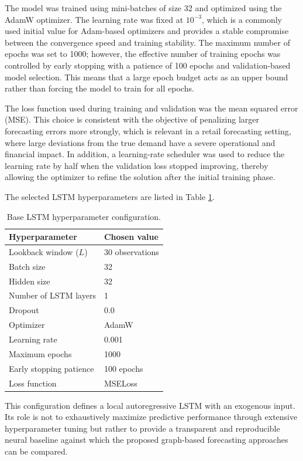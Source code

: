 The model was trained using mini-batches of size 32 and optimized using the AdamW optimizer. The learning rate was fixed at $10^{-3}$, which is a commonly used initial value for Adam-based optimizers and provides a stable compromise between the convergence speed and training stability. The maximum number of epochs was set to 1000; however, the effective number of training epochs was controlled by early stopping with a patience of 100 epochs and validation-based model selection. This means that a large epoch budget acts as an upper bound rather than forcing the model to train for all epochs.

The loss function used during training and validation was the mean squared error (MSE). This choice is consistent with the objective of penalizing larger forecasting errors more strongly, which is relevant in a retail forecasting setting, where large deviations from the true demand have a severe operational and financial impact. In addition, a learning-rate scheduler was used to reduce the learning rate by half when the validation loss stopped improving, thereby allowing the optimizer to refine the solution after the initial training phase.

The selected LSTM hyperparameters are listed in Table \ref{tab:lstm_hyperparameters}.

\begin{table}[H]
\centering
\caption{Base LSTM hyperparameter configuration.}
\label{tab:lstm_hyperparameters}
\begin{tabular}{ll}
\hline
\textbf{Hyperparameter} & \textbf{Chosen value} \\
\hline
Lookback window ($L$) & 30 observations \\
Batch size & 32 \\
Hidden size & 32 \\
Number of LSTM layers & 1 \\
Dropout & 0.0 \\
Optimizer & AdamW \\
Learning rate & 0.001 \\
Maximum epochs & 1000 \\
Early stopping patience & 100 epochs \\
Loss function & MSELoss \\
\hline
\end{tabular}
\end{table}

This configuration defines a local autoregressive LSTM with an exogenous input. Its role is not to exhaustively maximize predictive performance through extensive hyperparameter tuning but rather to provide a transparent and reproducible neural baseline against which the proposed graph-based forecasting approaches can be compared.



